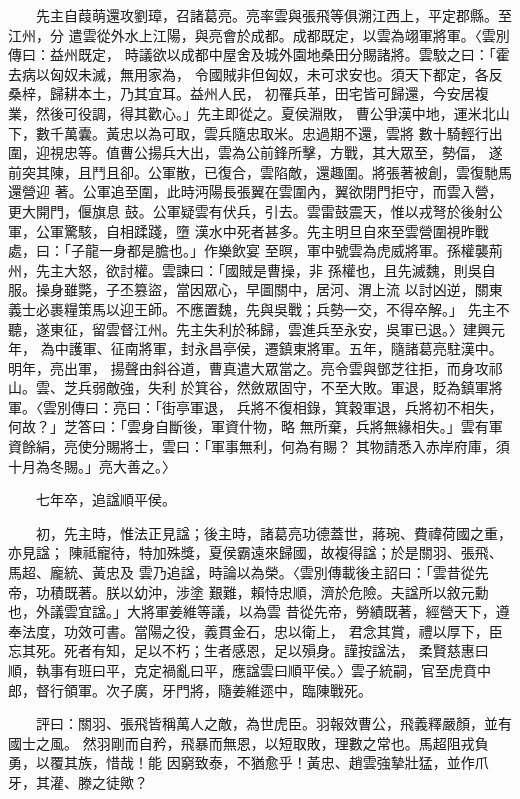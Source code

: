 \documentclass[11pt]{article}
\begin{document}
\begin{itemize}
　　先主自葭萌還攻劉璋，召諸葛亮。亮率雲與張飛等俱溯江西上，平定郡縣。至江州，分
遣雲從外水上江陽，與亮會於成都。成都既定，以雲為翊軍將軍。〈雲別傳曰：益州既定，
時議欲以成都中屋舍及城外園地桑田分賜諸將。雲駮之曰：「霍去病以匈奴未滅，無用家為，
令國賊非但匈奴，未可求安也。須天下都定，各反桑梓，歸耕本土，乃其宜耳。益州人民，
初罹兵革，田宅皆可歸還，今安居複業，然後可役調，得其歡心。」先主即從之。夏侯淵敗，
曹公爭漢中地，運米北山下，數千萬囊。黃忠以為可取，雲兵隨忠取米。忠過期不還，雲將
數十騎輕行出圍，迎視忠等。值曹公揚兵大出，雲為公前鋒所擊，方戰，其大眾至，勢偪，
遂前突其陳，且鬥且卻。公軍散，已復合，雲陷敵，還趣圍。將張著被創，雲復馳馬還營迎
著。公軍追至圍，此時沔陽長張翼在雲圍內，翼欲閉門拒守，而雲入營，更大開門，偃旗息
鼓。公軍疑雲有伏兵，引去。雲雷鼓震天，惟以戎弩於後射公軍，公軍驚駭，自相蹂踐，墮
漢水中死者甚多。先主明旦自來至雲營圍視昨戰處，曰：「子龍一身都是膽也。」作樂飲宴
至暝，軍中號雲為虎威將軍。孫權襲荊州，先主大怒，欲討權。雲諫曰：「國賊是曹操，非
孫權也，且先滅魏，則吳自服。操身雖斃，子丕篡盜，當因眾心，早圖關中，居河、渭上流
以討凶逆，關東義士必裹糧策馬以迎王師。不應置魏，先與吳戰；兵勢一交，不得卒解。」
先主不聽，遂東征，留雲督江州。先主失利於秭歸，雲進兵至永安，吳軍已退。〉建興元年，
為中護軍、征南將軍，封永昌亭侯，遷鎮東將軍。五年，隨諸葛亮駐漢中。明年，亮出軍，
揚聲由斜谷道，曹真遣大眾當之。亮令雲與鄧芝往拒，而身攻祁山。雲、芝兵弱敵強，失利
於箕谷，然斂眾固守，不至大敗。軍退，貶為鎮軍將軍。〈雲別傳曰：亮曰：「街亭軍退，
兵將不復相錄，箕穀軍退，兵將初不相失，何故？」芝答曰：「雲身自斷後，軍資什物，略
無所棄，兵將無緣相失。」雲有軍資餘絹，亮使分賜將士，雲曰：「軍事無利，何為有賜？
其物請悉入赤岸府庫，須十月為冬賜。」亮大善之。〉

　　七年卒，追諡順平侯。

　　初，先主時，惟法正見諡；後主時，諸葛亮功德蓋世，蔣琬、費禕荷國之重，亦見諡；
陳祗寵待，特加殊獎，夏侯霸遠來歸國，故複得諡；於是關羽、張飛、馬超、龐統、黃忠及
雲乃追諡，時論以為榮。〈雲別傳載後主詔曰：「雲昔從先帝，功積既著。朕以幼沖，涉塗
艱難，賴恃忠順，濟於危險。夫諡所以敘元勳也，外議雲宜諡。」大將軍姜維等議，以為雲
昔從先帝，勞績既著，經營天下，遵奉法度，功效可書。當陽之役，義貫金石，忠以衛上，
君念其賞，禮以厚下，臣忘其死。死者有知，足以不朽；生者感恩，足以殞身。謹按諡法，
柔賢慈惠曰順，執事有班曰平，克定禍亂曰平，應諡雲曰順平侯。〉雲子統嗣，官至虎賁中
郎，督行領軍。次子廣，牙門將，隨姜維遝中，臨陳戰死。

　　評曰：關羽、張飛皆稱萬人之敵，為世虎臣。羽報效曹公，飛義釋嚴顏，並有國士之風。
然羽剛而自矜，飛暴而無恩，以短取敗，理數之常也。馬超阻戎負勇，以覆其族，惜哉！能
因窮致泰，不猶愈乎！黃忠、趙雲強摯壯猛，並作爪牙，其灌、滕之徒歟？
\end{itemize}
\end{document}
